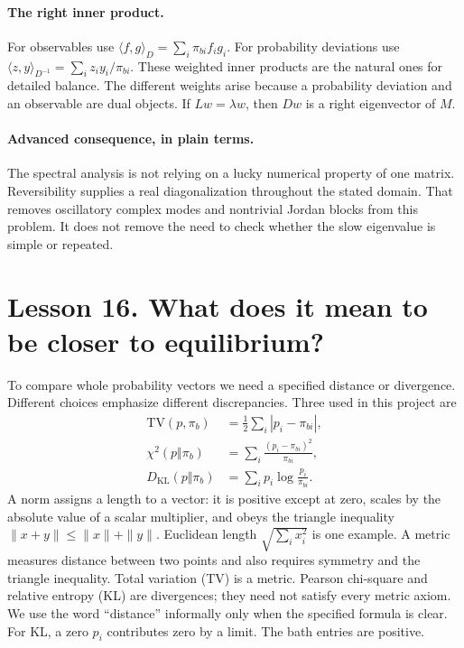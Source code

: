 \paragraph{The right inner product.}
For observables use $\langle f,g\rangle_D=\sum_i\pi_{bi}f_i g_i$.
For probability deviations use
$\langle z,y\rangle_{D^{-1}}=\sum_i z_i y_i/\pi_{bi}$.
These weighted inner products are the natural ones for detailed balance.
The different weights arise because a probability deviation and an
observable are dual objects. If $Lw=\lambda w$, then $Dw$ is a right
eigenvector of $M$.

\paragraph{Advanced consequence, in plain terms.}
The spectral analysis is not relying on a lucky numerical property of one
matrix. Reversibility supplies a real diagonalization throughout the stated
domain. That removes oscillatory complex modes and nontrivial Jordan blocks
from this problem. It does not remove the need to check whether the slow
eigenvalue is simple or repeated.

\clearpage
\section*{Lesson 16. What does it mean to be closer to equilibrium?}
To compare whole probability vectors we need a specified distance or
divergence. Different choices emphasize different discrepancies. Three used
in this project are
\begin{align*}
\mathrm{TV}(p,\pi_b)&=\frac12\sum_i|p_i-\pi_{bi}|,\\
\chi^2(p\Vert\pi_b)&=\sum_i\frac{(p_i-\pi_{bi})^2}{\pi_{bi}},\\
D_{\mathrm{KL}}(p\Vert\pi_b)&=\sum_i p_i\log\frac{p_i}{\pi_{bi}}.
\end{align*}
A norm assigns a length to a vector: it is positive except at zero,
scales by the absolute value of a scalar multiplier, and obeys the triangle
inequality $\|x+y\|\leq\|x\|+\|y\|$. Euclidean length
$\sqrt{\sum_i x_i^2}$ is one example. A metric measures distance between
two points and also requires symmetry and the triangle inequality.
Total variation (TV) is a metric. Pearson chi-square and relative entropy
(KL) are divergences; they need not satisfy every metric axiom. We use the
word ``distance'' informally only when the specified formula is clear.
For KL, a zero $p_i$ contributes zero by a limit. The bath entries are positive.

